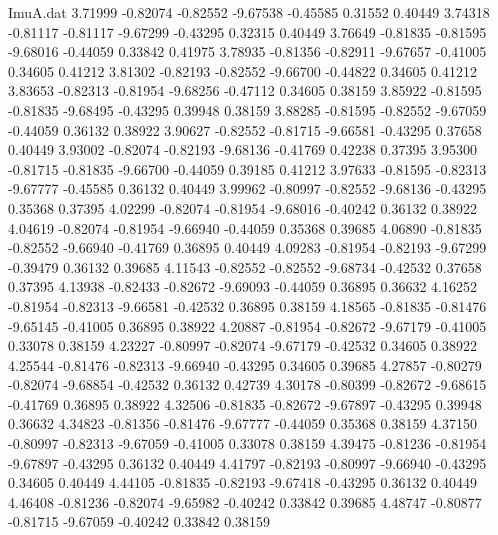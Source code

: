 \begin{filecontents}{ImuA.dat}
   3.71999   -0.82074   -0.82552   -9.67538   -0.45585    0.31552    0.40449
   3.74318   -0.81117   -0.81117   -9.67299   -0.43295    0.32315    0.40449
   3.76649   -0.81835   -0.81595   -9.68016   -0.44059    0.33842    0.41975
   3.78935   -0.81356   -0.82911   -9.67657   -0.41005    0.34605    0.41212
   3.81302   -0.82193   -0.82552   -9.66700   -0.44822    0.34605    0.41212
   3.83653   -0.82313   -0.81954   -9.68256   -0.47112    0.34605    0.38159
   3.85922   -0.81595   -0.81835   -9.68495   -0.43295    0.39948    0.38159
   3.88285   -0.81595   -0.82552   -9.67059   -0.44059    0.36132    0.38922
   3.90627   -0.82552   -0.81715   -9.66581   -0.43295    0.37658    0.40449
   3.93002   -0.82074   -0.82193   -9.68136   -0.41769    0.42238    0.37395
   3.95300   -0.81715   -0.81835   -9.66700   -0.44059    0.39185    0.41212
   3.97633   -0.81595   -0.82313   -9.67777   -0.45585    0.36132    0.40449
   3.99962   -0.80997   -0.82552   -9.68136   -0.43295    0.35368    0.37395
   4.02299   -0.82074   -0.81954   -9.68016   -0.40242    0.36132    0.38922
   4.04619   -0.82074   -0.81954   -9.66940   -0.44059    0.35368    0.39685
   4.06890   -0.81835   -0.82552   -9.66940   -0.41769    0.36895    0.40449
   4.09283   -0.81954   -0.82193   -9.67299   -0.39479    0.36132    0.39685
   4.11543   -0.82552   -0.82552   -9.68734   -0.42532    0.37658    0.37395
   4.13938   -0.82433   -0.82672   -9.69093   -0.44059    0.36895    0.36632
   4.16252   -0.81954   -0.82313   -9.66581   -0.42532    0.36895    0.38159
   4.18565   -0.81835   -0.81476   -9.65145   -0.41005    0.36895    0.38922
   4.20887   -0.81954   -0.82672   -9.67179   -0.41005    0.33078    0.38159
   4.23227   -0.80997   -0.82074   -9.67179   -0.42532    0.34605    0.38922
   4.25544   -0.81476   -0.82313   -9.66940   -0.43295    0.34605    0.39685
   4.27857   -0.80279   -0.82074   -9.68854   -0.42532    0.36132    0.42739
   4.30178   -0.80399   -0.82672   -9.68615   -0.41769    0.36895    0.38922
   4.32506   -0.81835   -0.82672   -9.67897   -0.43295    0.39948    0.36632
   4.34823   -0.81356   -0.81476   -9.67777   -0.44059    0.35368    0.38159
   4.37150   -0.80997   -0.82313   -9.67059   -0.41005    0.33078    0.38159
   4.39475   -0.81236   -0.81954   -9.67897   -0.43295    0.36132    0.40449
   4.41797   -0.82193   -0.80997   -9.66940   -0.43295    0.34605    0.40449
   4.44105   -0.81835   -0.82193   -9.67418   -0.43295    0.36132    0.40449
   4.46408   -0.81236   -0.82074   -9.65982   -0.40242    0.33842    0.39685
   4.48747   -0.80877   -0.81715   -9.67059   -0.40242    0.33842    0.38159

\end{filecontents}
